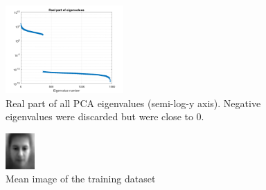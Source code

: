 \documentclass[10pt,technote]{IEEEtran}
\begin{document}
\begin{figure}[htb!]
    \centering
    \includegraphics[width=0.4\textwidth]{../results/ex1a/eigenvalues.png}
    \caption{Real part of all PCA eigenvalues (semi-log-y axis). Negative eigenvalues were discarded but were close to 0.}
    \label{fig:eigvals1}
\end{figure}

\begin{figure}[htb!]
    \centering
    \includegraphics[width=0.1\textwidth]{../results/ex1a/mean_image.png}
    \caption{Mean image of the training dataset}
    \label{fig:mean_im1}
\end{figure}
\end{document}
